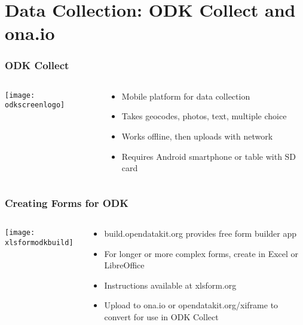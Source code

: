 \documentclass{beamer}
\begin{document}
\section{Data Collection: ODK Collect and ona.io}

\begin{frame}
\frametitle{ODK Collect}
 \begin{columns}
  \begin{column}[T]{0.4\textwidth}
   \texttt{[image: odkscreenlogo]}
  \end{column}  
  \begin{column}[T]{0.6\textwidth}
   \begin{itemize}
    \item Mobile platform for data collection
	\item Takes geocodes, photos, text, multiple choice
	\item Works offline, then uploads with network
	\item Requires Android smartphone or table with SD card
   \end{itemize}
  \end{column}
 \end{columns}
\end{frame}

\begin{frame}
\frametitle{Creating Forms for ODK}
  \begin{columns}
  \begin{column}[T]{0.6\textwidth}
   \texttt{[image: xlsformodkbuild]}
  \end{column}  
  \begin{column}[T]{0.4\textwidth}
   \begin{itemize}
    \item build.opendatakit.org provides free form builder app
	\item For longer or more complex forms, create in Excel or LibreOffice
	\item Instructions available at xlsform.org
	\item Upload to ona.io or opendatakit.org/xiframe to convert for use in ODK Collect
   \end{itemize}
  \end{column}
 \end{columns}

\end{frame}
\end{document}
